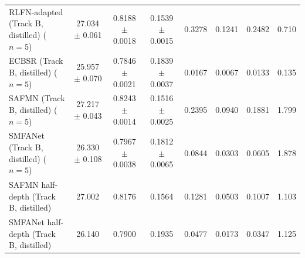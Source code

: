 \documentclass[pdflatex,sn-vancouver-num]{sn-jnl}
\begin{document}
\begin{tableorg}[htbp]
{\begin{tabular}{lccccccc}
RLFN-adapted (Track B, distilled) ($n=5$) & 27.034 $\pm$ 0.061 & 0.8188 $\pm$ 0.0018 & 0.1539 $\pm$ 0.0015 & 0.3278 & 0.1241 & 0.2482 & 0.710 \\
ECBSR (Track B, distilled) ($n=5$)      & 25.957 $\pm$ 0.070 & 0.7846 $\pm$ 0.0021 & 0.1839 $\pm$ 0.0037 & 0.0167 & 0.0067 & 0.0133 & 0.135 \\
SAFMN (Track B, distilled) ($n=5$)      & 27.217 $\pm$ 0.043 & 0.8243 $\pm$ 0.0014 & 0.1516 $\pm$ 0.0025 & 0.2395 & 0.0940 & 0.1881 & 1.799 \\
SMFANet (Track B, distilled) ($n=5$)    & 26.330 $\pm$ 0.108 & 0.7967 $\pm$ 0.0038 & 0.1812 $\pm$ 0.0065 & 0.0844 & 0.0303 & 0.0605 & 1.878 \\
SAFMN half-depth (Track B, distilled)   & 27.002 & 0.8176 & 0.1564 & 0.1281 & 0.0503 & 0.1007 & 1.103 \\
SMFANet half-depth (Track B, distilled) & 26.140 & 0.7900 & 0.1935 & 0.0477 & 0.0173 & 0.0347 & 1.125 \\
\bottomrule
\end{tabular}%
}

\end{tableorg}
\end{document}
